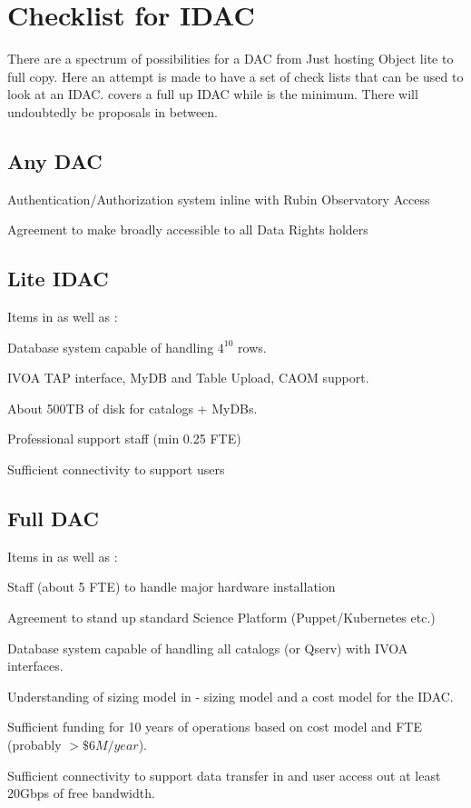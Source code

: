 
\section{Checklist for IDAC}\label{sec:checklist}

There are a spectrum of possibilities for a DAC from Just hosting Object lite to full copy.
Here an attempt is made to have a set of check lists  that can be used to look at an IDAC.
 covers a full up IDAC while   is the minimum.
There will undoubtedly be proposals in between.

\subsection{Any DAC} \label{sec:anyDAC}
\begin{todolist}
\item Authentication/Authorization system  inline with Rubin Observatory Access
\item Agreement to make broadly accessible to all Data Rights holders
\end{todolist}

\subsection{Lite IDAC} \label{sec:liteDAC}
Items in  as well as :
\begin{todolist}
\item Database system capable of handling $4^{10}$ rows.
\item IVOA TAP interface, MyDB and Table Upload, CAOM support.
\item About 500TB of disk for catalogs + MyDBs.
\item Professional support staff (min 0.25 FTE)
\item Sufficient connectivity to support users
\end{todolist}

\subsection{Full DAC} \label{sec:fullDAC}
Items in  as well as :
\begin{todolist}
\item Staff (about 5 FTE) to handle major hardware installation
\item Agreement to stand up standard Science Platform (Puppet/Kubernetes etc.)
\item Database system capable of handling all catalogs (or Qserv) with IVOA  interfaces.
\item Understanding of sizing model in  - sizing model and a cost model for the IDAC.
\item Sufficient funding for 10 years of operations  based on cost model and FTE (probably $>\$6M/year$).
\item Sufficient connectivity to support data transfer in and user access out at least 20Gbps of free bandwidth.
\end{todolist}
